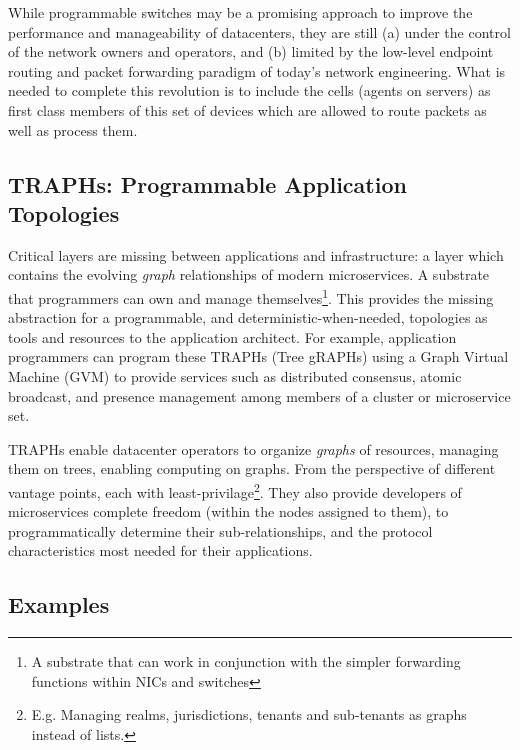 \documentclass[../HFT-main.tex]{subfiles}
\begin{document}
While programmable switches may be a promising approach to improve the performance and manageability of datacenters, they are still (a)  under the control of the network owners and operators, and (b) limited by the low-level endpoint routing and packet forwarding paradigm of today's network engineering. What is needed to complete this revolution is to include the cells (agents on servers) as first class members of this set of devices which are allowed to route packets as well as process them.

\vspace{-8pt}
\subsection*{TRAPHs: Programmable Application Topologies}
 
Critical layers are missing between applications and infrastructure: a layer which contains the evolving \emph{graph} relationships of modern microservices. A substrate that  programmers can own and manage themselves\footnote{A substrate that can work in conjunction with the simpler forwarding functions within NICs and switches}.
This provides the missing abstraction for a programmable, and deterministic-when-needed, topologies as tools and resources to the application architect. For example, application programmers can program these TRAPHs (Tree gRAPHs) using a Graph Virtual Machine (GVM) to provide services such as distributed consensus, atomic broadcast, and presence management among members of a cluster or microservice set. %

TRAPHs enable datacenter operators to organize \emph{graphs} of resources, managing them on trees, enabling computing on graphs. From the perspective of different vantage points, each with least-privilage\footnote{E.g. Managing realms, jurisdictions, tenants and sub-tenants as graphs instead of lists.}. They also provide developers of microservices complete freedom (within the nodes assigned to them), to programmatically determine their sub-relationships, and the protocol characteristics most needed for their applications.
\vspace{-16pt}
\subsection*{Examples}
\vspace{-2pt}
\end{document}
